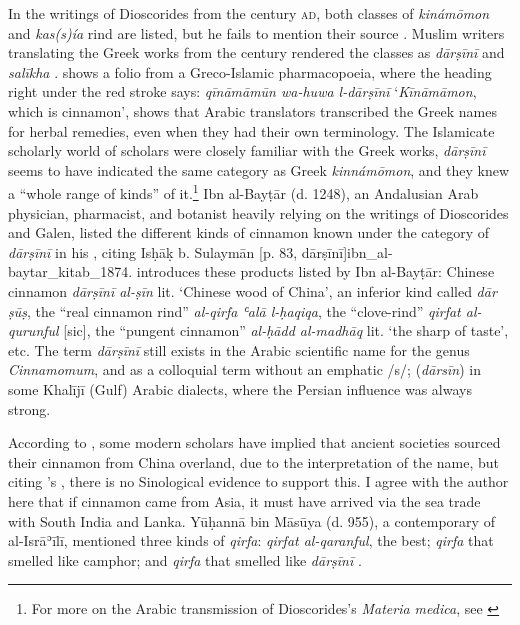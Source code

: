 In the writings of Dioscorides from the  century \textsc{ad}, both classes of  \textit{kinámōmon} and  \textit{kas(s)ía} rind are listed, but he fails to mention their source \autocite{alam_darcini_2011}. Muslim writers translating the Greek works from the  century rendered the classes as \textit{dārṣīnī} and \textit{salīkha} \autocite{alam_darcini_2011}.  shows a folio from a Greco-Islamic pharmacopoeia, where the heading right under the red stroke says: 
\textit{q\={i}n\={a}m\={a}m\={u}n wa-huwa l-d\={a}r\d{s}\={i}n\={i}} `\textit{Kīnāmāmon}, which is cinnamon', shows that Arabic translators transcribed the Greek names for herbal remedies, even when they had their own terminology. The Islamicate scholarly world of scholars were closely familiar with the Greek works, \textit{dārṣīnī} seems to have indicated the same category as Greek \textit{kinnámōmon}, and they knew a ``whole range of kinds'' of it.\footnote{For more on the Arabic transmission of Dioscorides's \textit{Materia medica}, see \textcite{gutas_arabic_2012}} Ibn al-Bayṭār (d. 1248), an Andalusian Arab physician, pharmacist, and botanist heavily relying on the writings of Dioscorides and Galen, listed the different kinds of cinnamon known under the category of \textit{dārṣīnī} in his , citing Isḥāḳ b. Sulaymān [p. 83, dārṣīnī]{ibn_al-baytar_kitab_1874}. \textcite{dietrich_dar_2004} introduces these products listed by Ibn al-Bayṭār: Chinese cinnamon \textit{dārṣīnī al-ṣīn} lit. `Chinese wood of China', an inferior kind called \textit{dār ṣūṣ}, the ``real cinnamon rind'' \textit{al-qirfa ʿalā l-ḥaqiqa}, the ``clove-rind'' \textit{qirfat al-qurunful} [sic], the ``pungent cinnamon'' \textit{al-ḥādd al-madhāq} lit. `the sharp of taste', etc. The term \textit{dārṣīnī} still exists in the Arabic scientific name for the genus \textit{Cinnamomum}, and as a colloquial term without an emphatic /s/;  (\textit{dārsīn}) in some Khalījī (Gulf) Arabic dialects, where the Persian influence was always strong.

According to \autocite{alam_darcini_2011}, some modern scholars have implied that ancient societies sourced their cinnamon from China overland, due to the interpretation of the name, but citing \textcite{laufer_sino-iranica_1919}'s , there is no Sinological evidence to support this. I agree with the author here that if cinnamon came from Asia, it must have arrived via the sea trade with South India and Lanka. Yūḥannā bin Māsūya (d. 955), a contemporary of al-Isrāʾīlī, mentioned three kinds of \textit{qirfa}: \textit{qirfat al-qaranful}, the best; \textit{qirfa} that smelled like camphor; and \textit{qirfa} that smelled like \textit{dārṣīnī} \autocite{alam_darcini_2011}.

